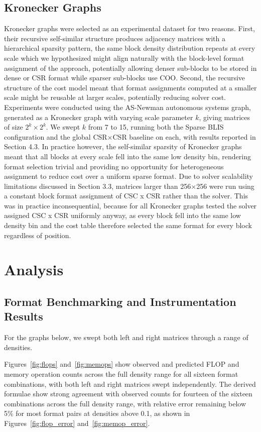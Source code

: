 \subsection{Kronecker Graphs}
Kronecker graphs were selected as an experimental dataset for two reasons.
First, their recursive self-similar structure produces adjacency matrices with a
hierarchical sparsity pattern, the same block density distribution repeats at every scale
which we hypothesized might align naturally with the block-level format assignment
of the approach, potentially allowing denser sub-blocks to be stored in dense or
CSR format while sparser sub-blocks use COO. Second, the recursive structure of
the cost model meant that format assignments computed at a smaller scale might
be reusable at larger scales, potentially reducing solver cost.
Experiments were conducted using the AS-Newman autonomous systems graph,
generated as a Kronecker graph with varying scale parameter $k$, giving
matrices of size $2^k \times 2^k$. We swept $k$ from 7 to 15, running both the
Sparse BLIS configuration and the global CSR×CSR baseline on each, with results
reported in Section 4.3.
In practice however, the self-similar sparsity of Kronecker graphs meant
that all blocks at every scale fell into the same low density bin, rendering
format selection trivial and providing no opportunity for heterogeneous assignment
to reduce cost over a uniform sparse format.
Due to solver scalability limitations discussed in Section 3.3, matrices larger than
256×256 were run using a constant block format assignment of CSC x CSR rather than the
solver. This was in practice inconsequential, because for all Kronecker graphs tested the
solver assigned CSC x CSR uniformly anyway, as every block fell into the same low density
bin and the cost table therefore selected the same format for every block regardless of position.

\section{Analysis}

\subsection{Format Benchmarking and Instrumentation Results}
For the graphs below, we swept both left and right matrices through a range of densities.

Figures~\ref{fig:flops} and~\ref{fig:memops} show observed and predicted FLOP and
memory operation counts across the full density range for all sixteen
format combinations, with both left and right matrices swept independently.
The derived formulae show strong agreement with observed counts for fourteen of
the sixteen combinations across the full density range, with relative error remaining
below 5\% for most format pairs at densities above 0.1, as shown in
Figures~\ref{fig:flop_error} and~\ref{fig:memop_error}.

